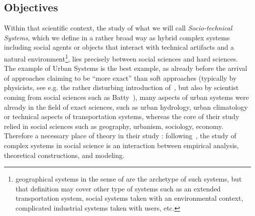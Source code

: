 \subsection*{Objectives}

Within that scientific context, the study of what we will call \emph{Socio-technical Systems}, which we define in a rather broad way as hybrid complex systems including social agents or objects that interact with technical artifacts and a natural environment\footnote{geographical systems in the sense of \cite{dollfus1975some} are the archetype of such systems, but that definition may cover other type of systems such as an extended transportation system, social systems taken with an environmental context, complicated industrial systems taken with users, etc.}, lies precisely between social sciences and hard sciences. The example of Urban Systems is the best example, as already before the arrival of approaches claiming to be ``more exact'' than soft approaches (typically by physicists, see e.g. the rather disturbing introduction of~\cite{louf2014scaling}, but also by scientist coming from social sciences such as Batty~\cite{batty2013new}), many aspects of urban systems were already in the field of exact sciences, such as urban hydrology, urban climatology or technical aspects of transportation systems, whereas the core of their study relied in social sciences such as geography, urbanism, sociology, economy. Therefore a necessary place of theory in their study : following~\cite{livet2010}, the study of complex systems in social science is an interaction between empirical analysis, theoretical constructions, and modeling.

